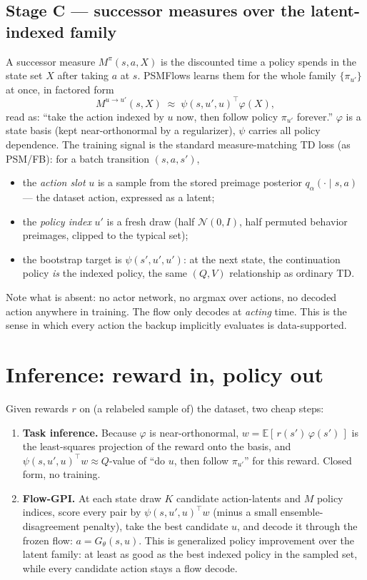 \documentclass[11pt]{article}
\newcommand{\E}{\mathbb{E}}
\begin{document}
\subsection{Stage C --- successor measures over the latent-indexed family}

A successor measure $M^\pi(s,a,X)$ is the discounted time a policy spends in the state
set $X$ after taking $a$ at $s$. PSMFlows learns them for the whole family
$\{\pi_{u'}\}$ at once, in factored form
\[
  M^{u\to u'}(s,X)\;\approx\;\psi(s,u',u)^\top\varphi(X),
\]
read as: ``take the action indexed by $u$ now, then follow policy $\pi_{u'}$ forever.''
$\varphi$ is a state basis (kept near-orthonormal by a regularizer), $\psi$ carries all
policy dependence. The training signal is the standard measure-matching TD loss (as
PSM/FB): for a batch transition $(s,a,s')$,
\begin{itemize}
  \item the \emph{action slot} $u$ is a sample from the stored preimage posterior
        $q_\alpha(\cdot\mid s,a)$ --- the dataset action, expressed as a latent;
  \item the \emph{policy index} $u'$ is a fresh draw (half $\mathcal{N}(0,I)$, half
        permuted behavior preimages, clipped to the typical set);
  \item the bootstrap target is $\psi(s',u',u')$: at the next state, the continuation
        policy \emph{is} the indexed policy, the same $(Q,V)$ relationship as ordinary
        TD.
\end{itemize}
Note what is absent: no actor network, no argmax over actions, no decoded action anywhere
in training. The flow only decodes at \emph{acting} time. This is the sense in which
every action the backup implicitly evaluates is data-supported.

\section{Inference: reward in, policy out}

Given rewards $r$ on (a relabeled sample of) the dataset, two cheap steps:
\begin{enumerate}
  \item \textbf{Task inference.} Because $\varphi$ is near-orthonormal,
        $w=\E[\,r(s')\,\varphi(s')\,]$ is the least-squares projection of the reward onto
        the basis, and $\psi(s,u',u)^\top w \approx Q$-value of ``do $u$, then follow
        $\pi_{u'}$'' for this reward. Closed form, no training.
  \item \textbf{Flow-GPI.} At each state draw $K$ candidate action-latents and $M$ policy
        indices, score every pair by $\psi(s,u',u)^\top w$ (minus a small ensemble-
        disagreement penalty), take the best candidate $u$, and decode it through the
        frozen flow: $a=G_\theta(s,u)$. This is generalized policy improvement over the
        latent family: at least as good as the best indexed policy in the sampled set,
        while every candidate action stays a flow decode.
\end{enumerate}
\end{document}

